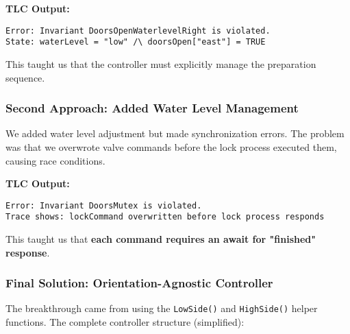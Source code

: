 \documentclass[12pt,a4paper]{article}
\begin{document}
\textbf{TLC Output:}
\begin{verbatim}
Error: Invariant DoorsOpenWaterlevelRight is violated.
State: waterLevel = "low" /\ doorsOpen["east"] = TRUE
\end{verbatim}

This taught us that the controller must explicitly manage the preparation sequence.

\subsubsection{Second Approach: Added Water Level Management}

We added water level adjustment but made synchronization errors. The problem was that we overwrote valve commands before the lock process executed them, causing race conditions.

\textbf{TLC Output:}
\begin{verbatim}
Error: Invariant DoorsMutex is violated.
Trace shows: lockCommand overwritten before lock process responds
\end{verbatim}

This taught us that \textbf{each command requires an await for "finished" response}.

\subsubsection{Final Solution: Orientation-Agnostic Controller}

The breakthrough came from using the \texttt{LowSide()} and \texttt{HighSide()} helper functions. The complete controller structure (simplified):
\end{document}
